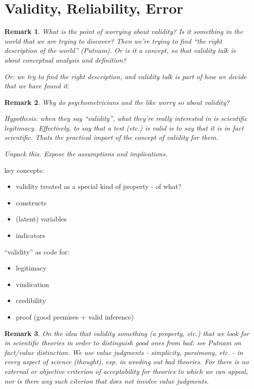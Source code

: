 \documentclass[11pt,twoside]{article}
\newtheorem{remark}{Remark}
\begin{document}
\clearpage
\section{Validity, Reliability, Error}
\label{sub:Validity}

\begin{remark}
What is the point of worrying about validity?  Is it something in the
world that we are trying to discover?  Then we're trying to find ``the
right description of the world'' (Putnam).  Or is it a concept, so
that validity talk is about conceptual analysis and definition?

Or: we try to find the right description, and validity talk is part of
how we decide that we have found it.

\end{remark}

\begin{remark}
Why do psychometricians and the like worry so about validity?

Hypothesis: when they say ``validity'', what they're really interested
in is scientific legitimacy.  Effectively, to say that a test (etc.)
is valid is to say that it is in fact scientific.  Thats the practical
import of the concept of validity for them.

Unpack this.  Expose the assumptions and implications.
\end{remark}

key concepts:

\begin{itemize}
\item validity treated as a special kind of property - of what?
\item constructs
\item (latent) variables
\item indicators
\end{itemize}

``validity'' as code for:

\begin{itemize}
\item legitimacy
\item vindication
\item credibility
\item proof (good premises + valid inference)
\end{itemize}

\begin{remark}
  On the idea that validity something (a property, etc.) that we look
  for in scientific theories in order to distinguish good ones from
  bad: see Putnam on fact/value distinction.  We use value judgments -
  simplicity, parsimony, etc. - in every aspect of science (thought),
  esp. in weeding out bad theories.  For there is no external or
  objective criterion of acceptability for theories to which we can
  appeal, nor is there any such citerion that does not involve value
  judgments.
\end{remark}
\end{document}

